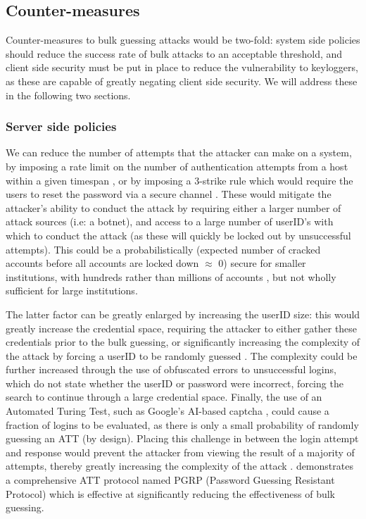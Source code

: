 \documentclass[british,10pt,a4paper]{article}
\begin{document}
\subsection{Counter-measures}
Counter-measures to bulk guessing attacks would be two-fold: system side policies should reduce the success rate of bulk attacks to an acceptable threshold, and client side security must be put in place to reduce the vulnerability to keyloggers, as these are capable of greatly negating client side security. We will address these in the following two sections.

\subsubsection{Server side policies}
We can reduce the number of attempts that the attacker can make on a system, by imposing a rate limit on the number of authentication attempts from a host within a given timespan \cite{Florencio2007-yp}, or by imposing a 3-strike rule which would require the users to reset the password via a secure channel \cite{Florencio2007-yp}. These would mitigate the attacker's ability to conduct the attack by requiring either a larger number of attack sources (i.e: a botnet), and access to a large number of userID's with which to conduct the attack (as these will quickly be locked out by unsuccessful attempts). This could be a probabilistically (expected number of cracked accounts before all accounts are locked down $\approx$ 0) secure for smaller institutions, with hundreds rather than millions of accounts \cite{Florencio2007-yp}, but not wholly sufficient for large institutions. 

The latter factor can be greatly enlarged by increasing the userID size: this would greatly increase the credential space, requiring the attacker to either gather these credentials prior to the bulk guessing, or significantly increasing the complexity of the attack by forcing a userID to be randomly guessed \cite{Kosamkar_undated-ik}. The complexity could be further increased through the use of obfuscated errors to unsuccessful logins, which do not state whether the userID or password were incorrect, forcing the search to continue through a large credential space. Finally, the use of an Automated Turing Test, such as Google's AI-based captcha \cite{noauthor_undated-lk}, could cause a fraction of logins to be evaluated, as there is only a small probability of randomly guessing an ATT (by design). Placing this challenge in between the login attempt and response would prevent the attacker from viewing the result of a majority of attempts, thereby greatly increasing the complexity of the attack \cite{Alsaleh2012-ek}. \citet{Alsaleh2012-ek} demonstrates a comprehensive ATT protocol named PGRP (Password Guessing Resistant Protocol) which is effective at significantly reducing the effectiveness of bulk guessing.
\end{document}
